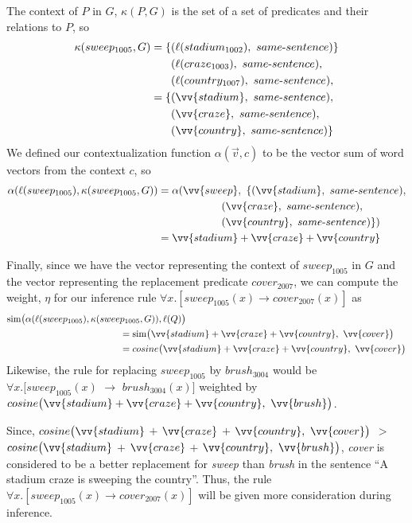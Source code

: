 The context of $P$ in $G$, $\kappa(P,G)$ is the set of a set of
predicates and their relations to $P$, so
\begin{align*}
\kappa(sweep_{1005}, G) 
= \{ & (\ell(\pred{stadium}{1002}),~same\text{-}sentence) \} \\
     & (\ell(\pred{craze}{1003}),~same\text{-}sentence), \\ 
     & (\ell(\pred{country}{1007}),~same\text{-}sentence), \\ 
= \{ & (\vv{stadium},~same\text{-}sentence), \\
     & (\vv{craze},~same\text{-}sentence), \\
     & (\vv{country},~same\text{-}sentence) \}
\end{align*}
We defined our contextualization function $\alpha(\vec v, c)$ to be the vector
sum of word vectors from the context $c$, so
\begin{align*}
\alpha(\ell(sweep_{1005}), \kappa(sweep_{1005}, G))
& = \alpha(\vv{sweep},~ \{ 
                (\vv{stadium},~same\text{-}sentence), \\
& \hspace{60px} (\vv{craze},~same\text{-}sentence), \\
& \hspace{60px} (\vv{country},~same\text{-}sentence) \}) \\
& = \vv{stadium} + \vv{craze} + \vv{country}
\end{align*}

Finally, since we have the vector representing the context of $sweep_{1005}$ in
$G$ and the vector representing the replacement predicate $cover_{2007}$, we can
compute the weight, $\eta$ for our inference rule $\forall x.[sweep_{1005}(x)
\to cover_{2007}(x)]$ as
\begin{align*}
& \simfunc\big(\alpha(\ell(sweep_{1005}), \kappa(sweep_{1005}, G)), \ell(Q)\big) \\
& \hspace{120px} = \simfunc\big(\vv{stadium} + \vv{craze} + \vv{country},~ \vv{cover}\big) \\
& \hspace{120px} = cosine\big(\vv{stadium} + \vv{craze} + \vv{country},~ \vv{cover}\big)
\end{align*}
Likewise, the rule for replacing $sweep_{1005}$ by $brush_{3004}$ would be 
$\forall x.[sweep_{1005}(x)$ $\to$ $brush_{3004}(x)]$ weighted by 
$cosine\big(\vv{stadium} + \vv{craze} + \vv{country},~ \vv{brush}\big)$.

Since, $cosine\big(\vv{stadium}$ $+$ $\vv{craze}$ $+$ $\vv{country},~
\vv{cover}\big)$ $>$ $cosine\big(\vv{stadium}$ $+$ $\vv{craze}$ $+$ $\vv{country},~
\vv{brush}\big)$, {\it cover} is considered to be a better replacement for {\it
sweep} than {\it brush} in the sentence ``A stadium craze is sweeping the
country''.  Thus, the rule $\forall x.[sweep_{1005}(x) \to cover_{2007}(x)]$
will be given more consideration during inference.


